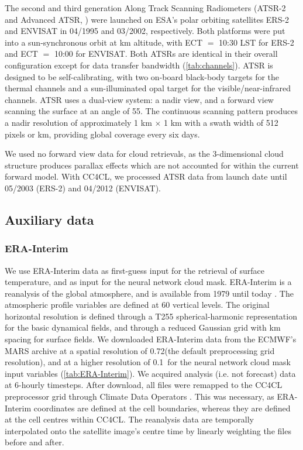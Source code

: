 The second and third generation Along Track Scanning Radiometers (ATSR-2 and Advanced ATSR, \citet{Merchant12}) were launched on ESA's polar orbiting satellites ERS-2 and ENVISAT in 04/1995 and 03/2002, respectively. Both platforms were put into a sun-synchronous orbit at  km altitude, with ECT $=$ 10:30 LST for ERS-2 and ECT $=$ 10:00 for ENVISAT. Both ATSRs are identical in their overall configuration except for data transfer bandwidth (\autoref{tab:channels}). ATSR is designed to be self-calibrating, with two on-board black-body targets for the thermal channels and a sun-illuminated opal target for the visible/near-infrared channels. ATSR uses a dual-view system: a nadir view, and a forward view scanning the surface at an angle of 55\textdegree. The continuous scanning pattern produces a nadir resolution of approximately 1 km $\times$ 1 km with a swath width of 512 pixels or  km, providing global coverage every six days. 

We used no forward view data for cloud retrievals, as the 3-dimensional cloud structure produces parallax effects which are not accounted for within the current forward model. With CC4CL, we processed ATSR data from launch date until 05/2003 (ERS-2) and 04/2012 (ENVISAT). 

\subsection{Auxiliary data}

\subsubsection{ERA-Interim}\label{sec:ERA-Interim}

We use ERA-Interim data as first-guess input for the retrieval of surface temperature, and as input for the neural network cloud mask. ERA-Interim is a reanalysis of the global atmosphere, and is available from 1979 until today \citep{ERAInterim,Dee11}. The atmospheric profile variables are defined at 60 vertical levels. The original horizontal resolution is defined through a T255 spherical-harmonic representation for the basic dynamical fields, and through a reduced Gaussian grid with  km spacing for surface fields. We downloaded ERA-Interim data from the ECMWF's MARS archive at a spatial resolution of 0.72\textdegree (the default preprocessing grid resolution), and at a higher resolution of 0.1\textdegree\ for the neural network cloud mask input variables (\autoref{tab:ERA-Interim}). We acquired analysis (i.e. not forecast) data at 6-hourly timesteps. After download, all files were remapped to the CC4CL preprocessor grid through Climate Data Operators \citep{CDO15}. This was necessary, as ERA-Interim coordinates are defined at the cell boundaries, whereas they are defined at the cell centres within CC4CL. The reanalysis data are temporally interpolated onto the satellite image's centre time by linearly weighting the files before and after.

